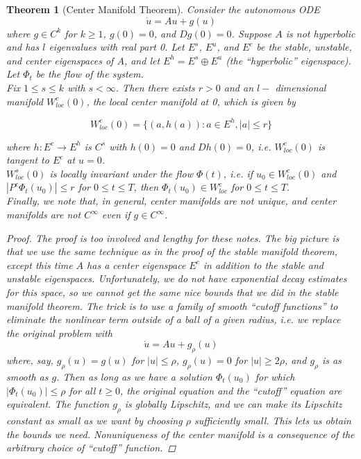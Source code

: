 \documentclass{article}
\newtheorem{theorem}{Theorem}[section]
\begin{document}
\begin{theorem}[Center Manifold Theorem]
Consider the autonomous ODE
\begin{equation}
\dot{u} = Au + g(u)
\end{equation}
where $g \in C^k$ for $k \geq 1$, $g(0) = 0$, and $Dg(0) = 0$. Suppose $A$ is not hyperbolic and has $l$ eigenvalues with real part 0. Let $E^s$, $E^u$, and $E^c$ be the stable, unstable, and center eigenspaces of $A$, and let $E^h = E^s \oplus E^u$ (the ``hyperbolic'' eigenspace). Let $\Phi_t$ be the flow of the system.\\

Fix $1 \leq s \leq k$ with $s < \infty$. Then there exists $r > 0$ and an $l-$ dimensional manifold $W^c_{loc}(0)$, the local center manifold at 0, which is given by

\[
W^c_{loc}(0) = \{ (a, h(a)) : a \in E^h, |a| \leq r \}
\]

where $h: E^c \rightarrow E^h$ is $C^s$ with $h(0) = 0$ and $Dh(0) = 0$, i.e. $W^c_{loc}(0)$ is tangent to $E^c$ at $u = 0$.\\

$W^s_{loc}(0)$ is \emph{locally} invariant under the flow $\Phi(t)$, i.e. if $u_0 \in W^c_{loc}(0)$ and $|P^c \Phi_t(u_0)| \leq r$ for $0 \leq t \leq T$, then $\Phi_t(u_0) \in W^c_{loc}$ for $0 \leq t \leq T$.\\

Finally, we note that, in general, center manifolds are not unique, and center manifolds are not $C^\infty$ even if $g \in C^\infty$.

\begin{proof}
The proof is too involved and lengthy for these notes. The big picture is that we use the same technique as in the proof of the stable manifold theorem, except this time $A$ has a center eigenspace $E^c$ in addition to the stable and unstable eigenspaces. Unfortunately, we do not have exponential decay estimates for this space, so we cannot get the same nice bounds that we did in the stable manifold theorem. The trick is to use a family of smooth ``cutoff functions'' to eliminate the nonlinear term outside of a ball of a given radius, i.e. we replace the original problem with
\begin{equation*}
\dot{u} = Au + g_\rho(u)
\end{equation*}
where, say, $g_\rho(u) = g(u)$ for $|u| \leq \rho$, $g_\rho(u) = 0$ for $|u| \geq 2 \rho$, and $g_\rho$ is as smooth as $g$. Then as long as we have a solution $\Phi_t(u_0)$ for which $|\Phi_t(u_0)| \leq \rho$ for all $t \geq 0$, the original equation and the ``cutoff'' equation are equivalent. The function $g_\rho$ is globally Lipschitz, and we can make its Lipschitz constant as small as we want by choosing $\rho$ sufficiently small. This lets us obtain the bounds we need. Nonuniqueness of the center manifold is a consequence of the arbitrary choice of ``cutoff'' function.

\end{proof}
\end{theorem}
\end{document}
